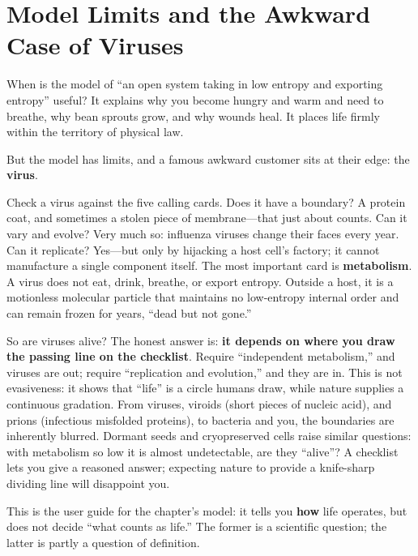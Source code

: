 \section{Model Limits and the Awkward Case of Viruses}

When is the model of ``an open system taking in low entropy and exporting entropy'' useful? It explains why you become hungry and warm and need to breathe, why bean sprouts grow, and why wounds heal. It places life firmly within the territory of physical law.

But the model has limits, and a famous awkward customer sits at their edge: the \textbf{virus}.

Check a virus against the five calling cards. Does it have a boundary? A protein coat, and sometimes a stolen piece of membrane---that just about counts. Can it vary and evolve? Very much so: influenza viruses change their faces every year. Can it replicate? Yes---but only by hijacking a host cell's factory; it cannot manufacture a single component itself. The most important card is \textbf{metabolism}. A virus does not eat, drink, breathe, or export entropy. Outside a host, it is a motionless molecular particle that maintains no low-entropy internal order and can remain frozen for years, ``dead but not gone.''

So are viruses alive? The honest answer is: \textbf{it depends on where you draw the passing line on the checklist}. Require ``independent metabolism,'' and viruses are out; require ``replication and evolution,'' and they are in. This is not evasiveness: it shows that ``life'' is a circle humans draw, while nature supplies a continuous gradation. From viruses, viroids (short pieces of nucleic acid), and prions (infectious misfolded proteins), to bacteria and you, the boundaries are inherently blurred. Dormant seeds and cryopreserved cells raise similar questions: with metabolism so low it is almost undetectable, are they ``alive''? A checklist lets you give a reasoned answer; expecting nature to provide a knife-sharp dividing line will disappoint you.

This is the user guide for the chapter's model: it tells you \textbf{how} life operates, but does not decide ``what counts as life.'' The former is a scientific question; the latter is partly a question of definition.

